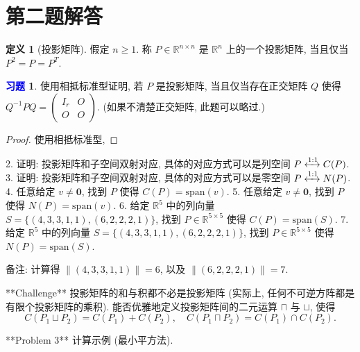 \documentclass[11pt]{ctexart}
\theoremstyle{definition}
\numberwithin{equation}{section}
\theoremstyle{definition}
\newtheorem*{definition}{定义}
\newtheorem{exercise}{\textcolor{blue}{习题}}
\theoremstyle{remark}
\begin{document}
\section{第二题解答}

\begin{definition}[投影矩阵]
    假定 $n\geq 1$. 称 $P\in \mathbb R^{n\times n}$ 是 $\mathbb R^n$ 上的一个投影矩阵, 当且仅当 $P^2=P=P^T$.
\end{definition}

\begin{exercise}
    使用相抵标准型证明, 若 $P$ 是投影矩阵, 当且仅当存在正交矩阵 $Q$ 使得 $Q^{-1}PQ = \begin{pmatrix}I_r&O\\O&O\end{pmatrix}$. (如果不清楚正交矩阵, 此题可以略过.) 
    \begin{proof}
        使用相抵标准型, 
    \end{proof}
\end{exercise}

2. 证明: 投影矩阵和子空间双射对应, 具体的对应方式可以是列空间 $P\xleftrightarrow {1:1} C(P)$.
3. 证明: 投影矩阵和子空间双射对应, 具体的对应方式可以是零空间 $P\xleftrightarrow {1:1} N(P)$.
4. 任意给定 $v\neq \mathbf 0$, 找到 $P$ 使得 $C(P)=\mathrm{span}(v)$.
5. 任意给定 $v\neq \mathbf 0$, 找到 $P$ 使得 $N(P)=\mathrm{span}(v)$.
6. 给定 $\mathbb R^5$ 中的列向量 $S=\{(4,3,3,1,1),(6,2,2,2,1)\}$, 找到 $P\in \mathbb R^{5\times 5}$ 使得 $C(P)=\mathrm{span}(S)$.
7. 给定 $\mathbb R^5$ 中的列向量 $S=\{(4,3,3,1,1),(6,2,2,2,1)\}$, 找到 $P\in \mathbb R^{5\times 5}$ 使得 $N(P)=\mathrm{span}(S)$.

备注: 计算得 $\|(4,3,3,1,1)\|=6$, 以及 $\|(6,2,2,2,1)\|=7$.



**Challenge** 投影矩阵的和与积都不必是投影矩阵 (实际上, 任何不可逆方阵都是有限个投影矩阵的乘积). 能否优雅地定义投影矩阵间的二元运算 $\sqcap$ 与 $\sqcup$, 使得
$$
C(P_1\sqcup P_2)=C(P_1)+C(P_2),\quad C(P_1\sqcap P_2)=C(P_1)\cap C(P_2).
$$



**Problem 3** 计算示例 (最小平方法).
\end{document}
